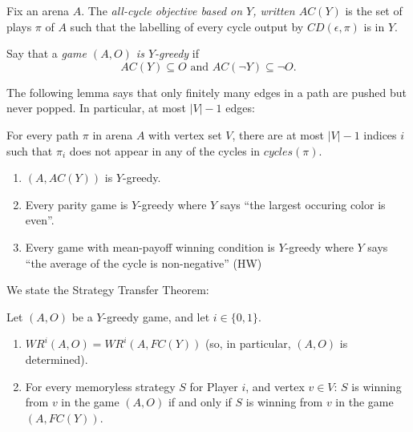 \documentclass[a4paper,10pt]{article}
\begin{document}
\begin{definition}[Greedy]\label{dfn: greedy}
Fix an arena $A$.
The \emph{all-cycle objective based on $Y$, written $AC(Y)$} is the set of plays $\pi$ of $A$ such that the labelling of every cycle output by $CD(\epsilon,\pi)$ is in $Y$.

Say that a {\em game $(A,O)$ is $Y$-greedy} if
\[
AC(Y) \subseteq O \textrm{ and }
AC(\neg Y) \subseteq \neg O.
\]
\end{definition}



The following lemma says that only finitely many edges in a path are pushed but never popped. In particular, at most $|V|-1$ edges:
\begin{lemma}\label{lem:V-1}
For every path $\pi$ in arena $A$ with vertex set $V$, there are at most $|V|-1$ indices $i$ such that $\pi_i$ does not appear in any of the cycles in $cycles(\pi)$.
\end{lemma}

\begin{example} \begin{enumerate}
\item $(A,AC(Y))$ is $Y$-greedy.
\item Every parity game is $Y$-greedy where $Y$ says ``the largest occuring color is even''.
\item Every game with mean-payoff winning condition is $Y$-greedy where $Y$ says ``the average of the cycle is non-negative'' (HW)
\end{enumerate}
\end{example}



We state the Strategy Transfer Theorem:

\begin{theorem} \label{thm:greedy}
Let $(A,O)$ be a $Y$-greedy game, and let $i \in \{0,1\}$.
\begin{enumerate}
\item $WR^i(A,O) = WR^i(A,FC(Y))$ (so, in particular, $(A,O)$ is determined).
\item For every memoryless strategy $S$ for Player $i$, and vertex $v \in V$:
 $S$ is winning from $v$ in the game $(A,O)$ if and only if $S$ is winning from $v$ in the
    game $(A,FC(Y))$.
\end{enumerate}
\end{theorem}
\end{document}
